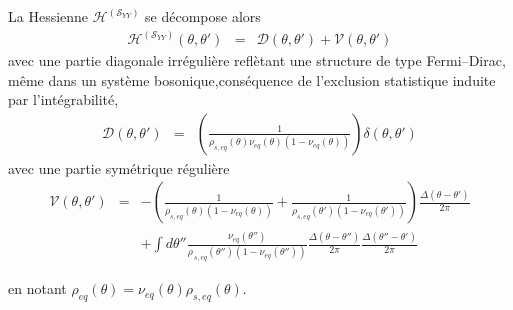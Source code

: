 La Hessienne $ \mathcal{H}^{(\mathcal{S}_{YY})}$ se décompose alors
\begin{eqnarray}
	\mathcal{H}^{(\mathcal{S}_{YY})}(\theta, \theta') & = & \mathcal{D}(\theta, \theta') + \mathcal{V}(\theta, \theta')
	\label{chap:fluctu:eq:hessienne3} 	
\end{eqnarray}
avec une partie diagonale irrégulière reflètant une structure de type Fermi–Dirac, même dans un système bosonique,conséquence de l’exclusion statistique induite par l’intégrabilité,
\begin{eqnarray}
	\mathcal{D}(\theta, \theta') & = & \left ( \frac{1}{\rho_{\! s , eq}(\theta) \nu_{\! eq}(\theta) (1 - \nu_{\! eq}(\theta)) }\right )  \delta(\theta, \theta') 	
\end{eqnarray}
avec une partie symétrique régulière
\begin{eqnarray}
	\mathcal{V}(\theta, \theta')	 & = & - \left ( \frac{1}{\rho_{\! s , eq}(\theta) (1 - \nu_{\! eq}(\theta) ) } + \frac{1}{\rho_{\! s, eq}(\theta')   (1 - \nu_{\! eq}(\theta')) }\right )\frac{\Delta(\theta - \theta')}{2\pi}\\
	&&  + \int d \theta''  \frac{\nu_{\! eq}(\theta'')}{\rho_{\, s, eq}(\theta'')(1 - \nu_{\! eq}(\theta'')) } \frac{\Delta(\theta - \theta'' )}{2\pi} \frac{\Delta(\theta''  - \theta')}{2\pi}
	\label{chap:fluctu:eq:reg}
\end{eqnarray}
 
 en notant $\rho_{\! eq}(\theta) = \nu_{\! eq}(\theta)\rho_{\! s, eq}(\theta)$.\\



